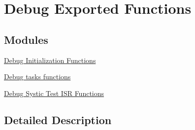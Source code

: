 \hypertarget{group___debug___exported___functions}{}\section{Debug Exported Functions}
\label{group___debug___exported___functions}
\subsection*{Modules}
\begin{DoxyCompactItemize}
\item 
\hyperlink{group___debug___exported___functions___group1}{Debug Initialization Functions}
\item 
\hyperlink{group___debug___exported___functions___group2}{Debug tasks functions}
\item 
\hyperlink{group___debug___exported___functions___group3}{Debug Systic Test I\+S\+R Functions}
\end{DoxyCompactItemize}


\subsection{Detailed Description}
